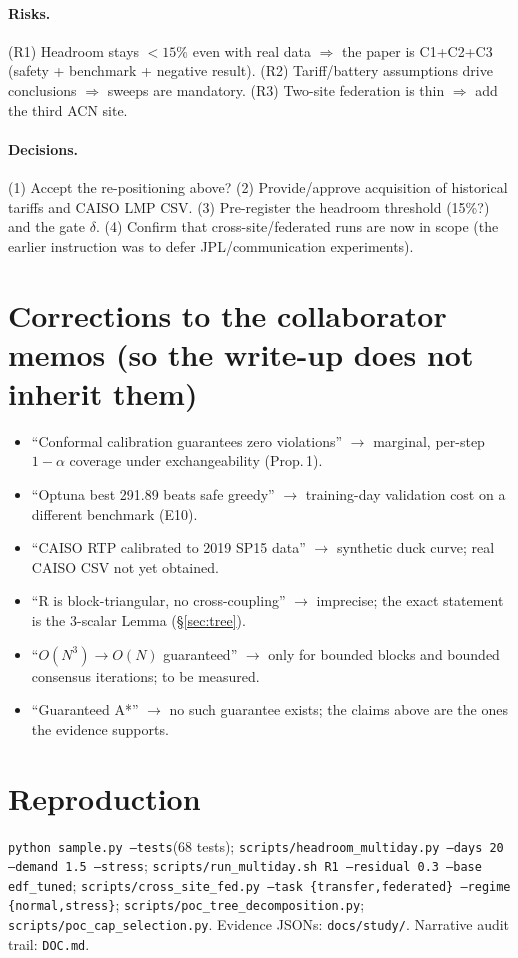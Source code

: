 \documentclass[10pt,a4paper]{article}
\begin{document}
\paragraph{Risks.} (R1) Headroom stays $<15\%$ even with real data $\Rightarrow$ the paper is C1+C2+C3 (safety + benchmark + negative result). (R2) Tariff/battery assumptions drive conclusions
$\Rightarrow$ sweeps are mandatory. (R3) Two-site federation is thin $\Rightarrow$ add the third ACN site.
\paragraph{Decisions.} (1) Accept the re-positioning above? (2) Provide/approve acquisition of historical tariffs and CAISO LMP CSV. (3) Pre-register the headroom threshold (15\%?) and the gate $\delta$. (4) Confirm that cross-site/federated runs are now in scope (the earlier instruction was to defer JPL/communication experiments).

\appendix
\section{Corrections to the collaborator memos (so the write-up does not inherit them)}
\small
\begin{itemize}
\item ``Conformal calibration guarantees zero violations'' $\to$ marginal, per-step $1-\alpha$ coverage under exchangeability (Prop.\,1).
\item ``Optuna best 291.89 beats safe greedy'' $\to$ training-day validation cost on a different benchmark (E10).
\item ``CAISO RTP calibrated to 2019 SP15 data'' $\to$ synthetic duck curve; real CAISO CSV not yet obtained.
\item ``R is block-triangular, no cross-coupling'' $\to$ imprecise; the exact statement is the 3-scalar Lemma (\S\ref{sec:tree}).
\item ``$O(N^3)\to O(N)$ guaranteed'' $\to$ only for bounded blocks and bounded consensus iterations; to be measured.
\item ``Guaranteed A*'' $\to$ no such guarantee exists; the claims above are the ones the evidence supports.
\end{itemize}
\normalsize

\section{Reproduction}
\small\texttt{python sample.py --tests}\;(68 tests); \texttt{scripts/headroom\_multiday.py --days 20 --demand 1.5 --stress}; \texttt{scripts/run\_multiday.sh R1 --residual 0.3 --base edf\_tuned};
\texttt{scripts/cross\_site\_fed.py --task \{transfer,federated\} --regime \{normal,stress\}}; \texttt{scripts/poc\_tree\_decomposition.py}; \texttt{scripts/poc\_cap\_selection.py}.
Evidence JSONs: \texttt{docs/study/}. Narrative audit trail: \texttt{DOC.md}.
\end{document}
